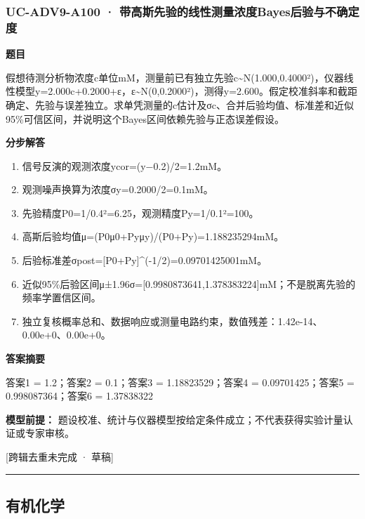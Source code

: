\documentclass[UTF8,11pt,a4paper]{ctexart}
\begin{document}
\subsubsection*{UC-ADV9-A100 · 带高斯先验的线性测量浓度Bayes后验与不确定度}
\noindent\textbf{题目}\par
假想待测分析物浓度c单位mM，测量前已有独立先验c\textasciitilde{}N(1.000,0.4000²)，仪器线性模型y=2.000c+0.2000+ε，ε\textasciitilde{}N(0,0.2000²)，测得y=2.600。假定校准斜率和截距确定、先验与误差独立。求单凭测量的c估计及σc、合并后验均值、标准差和近似95\%可信区间，并说明这个Bayes区间依赖先验与正态误差假设。\par
\medskip\noindent\textbf{分步解答}
\begin{enumerate}
\item 信号反演的观测浓度ycor=(y−0.2)/2=1.2mM。
\item 观测噪声换算为浓度σy=0.2000/2=0.1mM。
\item 先验精度P0=1/0.4²=6.25，观测精度Py=1/0.1²=100。
\item 高斯后验均值μ=(P0μ0+Pyμy)/(P0+Py)=1.188235294mM。
\item 后验标准差σpost=[P0+Py]\textasciicircum{}(-1/2)=0.09701425001mM。
\item 近似95\%后验区间μ±1.96σ=[0.9980873641,1.378383224]mM；不是脱离先验的频率学置信区间。
\item 独立复核概率总和、数据响应或测量电路约束，数值残差：1.42e-14、0.00e+0、0.00e+0。
\end{enumerate}
\noindent\textbf{答案摘要}\par
答案1 = 1.2；答案2 = 0.1；答案3 = 1.18823529；答案4 = 0.09701425；答案5 = 0.998087364；答案6 = 1.37838322\par
\noindent\textbf{模型前提：}
题设校准、统计与仪器模型按给定条件成立；不代表获得实验计量认证或专家审核。\par
\noindent\textcolor{red!65!black}{[跨辑去重未完成 · 草稿]} \par
\medskip\hrule\medskip
\subsection*{有机化学}
\end{document}
